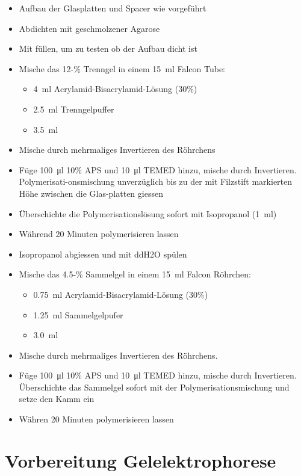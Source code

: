 \documentclass[a4paper,german]{scrreprt}
\begin{document}
\begin{itemize}
	\item Aufbau der Glasplatten und Spacer wie vorgeführt
	\item Abdichten mit geschmolzener Agarose
	\item Mit  füllen, um zu testen ob der Aufbau dicht ist
	\item Mische das 12-\% Trenngel in einem \SI{15}{\ml} Falcon Tube:
		\begin{itemize}
			\item \SI{4}{\ml} Acrylamid-Bisacrylamid-Lösung (30\%)
			\item \SI{2.5}{\ml} Trenngelpuffer
			\item \SI{3.5}{\ml} 
		\end{itemize}
	\item Mische durch mehrmaliges Invertieren des Röhrchens
	\item Füge \SI{100}{\ul} 10\% APS und \SI{10}{\ul} TEMED hinzu, mische durch
		Invertieren. Polymerisati-onsmischung unverzüglich bis zu der
		mit Filzstift markierten Höhe zwischen die Glas-platten giessen
	\item Überschichte die Polymerisationslösung sofort mit Isopropanol (\SI{1}{\ml})
	\item Während 20 Minuten polymerisieren lassen
	\item Isopropanol abgiessen und mit ddH2O spülen
	\item Mische das 4.5-\% Sammelgel in einem \SI{15}{ml} Falcon Röhrchen:
		\begin{itemize}
			\item \SI{0.75}{\ml} Acrylamid-Bisacrylamid-Lösung (30\%)
			\item \SI{1.25}{\ml} Sammelgelpufer
			\item \SI{3.0}{\ml} 
		\end{itemize}
	\item Mische durch mehrmaliges Invertieren des Röhrchens.
	\item Füge \SI{100}{\ul} 10\% APS und \SI{10}{\ul} TEMED hinzu, mische
		durch Invertieren. Überschichte das Sammelgel sofort mit der
		Polymerisationsmischung und setze den Kamm ein
	\item Währen 20 Minuten polymerisieren lassen
\end{itemize}

\section{Vorbereitung Gelelektrophorese}
\end{document}
